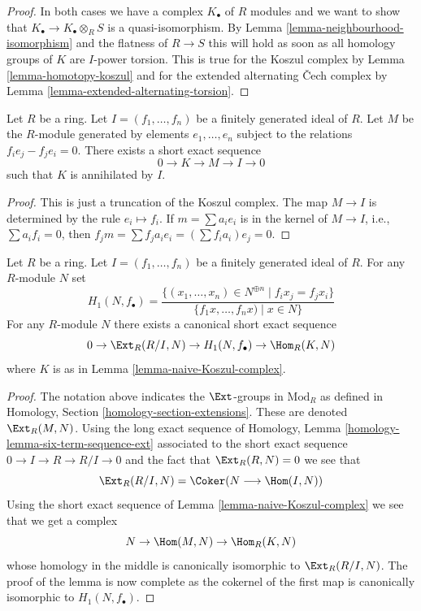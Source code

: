 \begin{proof}
In both cases we have a complex $K_\bullet$ of $R$ modules and we want
to show that $K_\bullet \to K_\bullet \otimes_R S$ is a quasi-isomorphism.
By Lemma \ref{lemma-neighbourhood-isomorphism} and the flatness of
$R \to S$ this will hold as soon as all homology groups of $K$ are $I$-power
torsion. This is true for the Koszul complex by
Lemma \ref{lemma-homotopy-koszul} and for the extended alternating {\v C}ech
complex by Lemma \ref{lemma-extended-alternating-torsion}.
\end{proof}

\begin{lemma}
\label{lemma-naive-Koszul-complex}
Let $R$ be a ring. Let $I = (f_1, \ldots, f_n)$ be a finitely generated ideal
of $R$. Let $M$ be the $R$-module generated by elements
$e_1, \ldots, e_n$ subject to the relations $f_i e_j - f_j e_i = 0$.
There exists a short exact sequence
$$
0 \to K \to M \to I \to 0
$$
such that $K$ is annihilated by $I$.
\end{lemma}

\begin{proof}
This is just a truncation of the Koszul complex.
The map $M \to I$ is determined by the rule $e_i \mapsto f_i$. If
$m = \sum a_i e_i$ is in the kernel of $M \to I$, i.e., $\sum a_i f_i = 0$,
then $f_j m = \sum f_j a_i e_i = (\sum f_i a_i) e_j = 0$.
\end{proof}

\begin{lemma}
\label{lemma-explicit-ext}
Let $R$ be a ring. Let $I = (f_1, \ldots, f_n)$ be a finitely generated ideal
of $R$. For any $R$-module $N$ set
$$
H_1(N, f_\bullet) =
\frac{\{(x_1, \ldots, x_n) \in N^{\oplus n} \mid f_i x_j = f_j x_i \}}
{\{f_1x, \ldots, f_nx) \mid x \in N\}}
$$
For any $R$-module $N$ there exists a canonical short exact sequence
$$
0 \to \Ext_R(R/I, N) \to H_1(N, f_\bullet) \to \Hom_R(K, N)
$$
where $K$ is as in
Lemma \ref{lemma-naive-Koszul-complex}.
\end{lemma}

\begin{proof}
The notation above indicates the $\Ext$-groups in $\text{Mod}_R$
as defined in
Homology, Section \ref{homology-section-extensions}.
These are denoted $\Ext_R(M, N)$. Using the long exact sequence of
Homology, Lemma \ref{homology-lemma-six-term-sequence-ext}
associated to the short exact sequence $0 \to I \to R \to R/I \to 0$
and the fact that $\Ext_R(R, N) = 0$ we see that
$$
\Ext_R(R/I, N) =
\Coker(N \longrightarrow \Hom(I, N))
$$
Using the short exact sequence of
Lemma \ref{lemma-naive-Koszul-complex}
we see that we get a complex
$$
N \to \Hom(M, N) \to \Hom_R(K, N)
$$
whose homology in the middle is canonically isomorphic to
$\Ext_R(R/I, N)$. The proof of the lemma is now complete
as the cokernel of the first map
is canonically isomorphic to $H_1(N, f_\bullet)$.
\end{proof}

